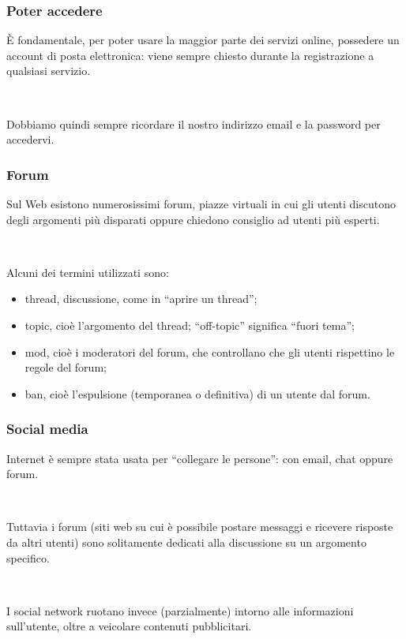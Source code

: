 \documentclass[]{beamer}
\begin{document}
\begin{frame}
\frametitle{Poter accedere}
È fondamentale, per poter usare la maggior parte dei servizi online, possedere un \alert{account di posta elettronica}: viene sempre chiesto durante la registrazione a qualsiasi servizio.\pause

~

Dobbiamo quindi \alert{sempre ricordare il nostro indirizzo email e la password per accedervi}.

\begin{figure}
\end{figure}
\end{frame}

\begin{frame}
\frametitle{Forum}
Sul Web esistono numerosissimi forum, \alert<1>{piazze virtuali} in cui gli utenti discutono degli argomenti più disparati oppure chiedono consiglio ad utenti più esperti.\pause

~

Alcuni dei termini utilizzati sono:
\begin{itemize}
  \item \alert<2>{thread}, discussione, come in ``aprire un thread'';\pause
  \item \alert<3>{topic}, cioè l'argomento del thread; ``off-topic'' significa ``fuori tema'';\pause
  \item \alert<4>{mod}, cioè i moderatori del forum, che controllano che gli utenti rispettino le regole del forum;\pause
  \item \alert<5>{ban}, cioè l'espulsione (temporanea o definitiva) di un utente dal forum.
\end{itemize}
\end{frame}


\begin{frame}
\frametitle{Social media}
Internet è sempre stata usata per ``collegare le persone'': con email, chat oppure forum.\pause

~

Tuttavia i forum (siti web su cui è possibile postare messaggi e ricevere risposte da altri utenti) sono solitamente dedicati alla discussione su un argomento specifico.\pause

~

I social network ruotano invece (parzialmente) intorno alle informazioni sull'utente, oltre a veicolare contenuti pubblicitari.
\end{frame}
\end{document}
